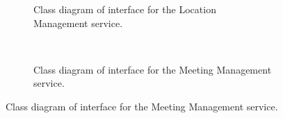 \documentclass[12pt]{article}
\begin{document}
\begin{figure}[H]
\begin{subfigure}[p]{0.47\textwidth}
\centering	
{}
\caption{Class diagram of interface for the Location Management service.}
\end{subfigure}
~
\begin{subfigure}[H]{0.47\textwidth}
\centering	
{}
\caption{Class diagram of interface for the Meeting Management service.}
\end{subfigure}


\end{figure}
\end{document}
